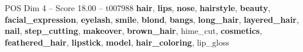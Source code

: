\begin{textsample}{POS Dim 4 – Score 18.00 – t007988}  \label{ex:f4_pos_028}
\textbf{hair}, \textbf{lips}, \textbf{nose}, \textbf{hairstyle}, \textbf{beauty}, \textbf{facial\_expression}, \textbf{eyelash}, \textbf{smile}, \textbf{blond}, \textbf{bangs}, \textbf{long\_hair}, \textbf{layered\_hair}, \textbf{nail}, \textbf{step\_cutting}, \textbf{makeover}, \textbf{brown\_hair}, hime\_cut, \textbf{cosmetics}, \textbf{feathered\_hair}, \textbf{lipstick}, \textbf{model}, \textbf{hair\_coloring}, lip\_gloss

\end{textsample}
